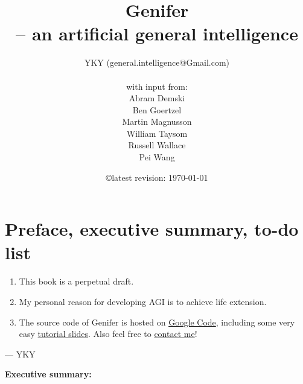 \documentclass[12pt, a4paper]{report}
\title{\textbf{Genifer\\-- an artificial general intelligence}}
\author{YKY (general.intelligence@Gmail.com)\\ \\
with input from:\\
Abram Demski\\
Ben Goertzel\\
Martin Magnusson\\
William Taysom\\
Russell Wallace\\
Pei Wang
}
\date{\copyright \quad latest revision: \today}
\theoremstyle{examples} \newtheorem{example}{Example}[section]
\begin{document}
\renewcommand{\normalsize}{\fontsize{12pt}{15pt}\selectfont}
\fontsize{12pt}{15pt} \selectfont


\maketitle
\dominitoc

\setcounter{chapter}{-1}
\chapter{Preface, executive summary, to-do list}

\begin{enumerate}

\item  This book is a perpetual draft.

\item  My personal reason for developing AGI is to achieve life extension.

\item  The source code of $\mbox{Genifer}$ is hosted on \href{http://code.google.com/p/genifer/}{Google Code}, including some very easy \href{http://code.google.com/p/genifer/downloads/list}{tutorial slides}.  Also feel free to \href{mailto:Generic.Intelligence@Gmail.com}{contact me}!

\end{enumerate}

\begin{flushright}
--- YKY
\end{flushright}

{\sffamily\bfseries\Huge Executive summary:}
\end{document}
